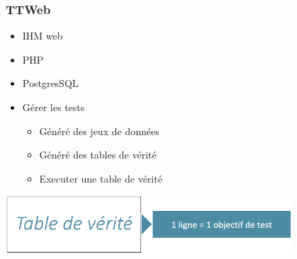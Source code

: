 \begin{frame}
    \frametitle{TTWeb}
    \begin{itemize}
        \item IHM web
        \item PHP
        \item PostgresSQL
        \item Gérer les tests
            \begin{itemize}
                \item Généré des jeux de données
                \item Généré des tables de vérité
                \item Executer une table de vérité
            \end{itemize}
    \end{itemize}
    \begin{center}
        \includegraphics[width=0.8\textwidth]{./img/truth_table.png}
    \end{center}
\end{frame}